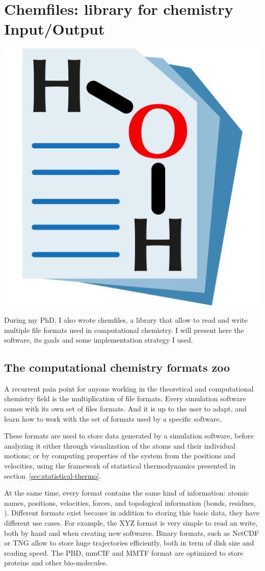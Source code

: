 \documentclass[thesis]{subfiles}
\begin{document}
\OnlyInSubfile{\appendix}
\chapter{Chemfiles: library for chemistry Input/Output}
\label{sec:chemfiles}

\vfill
\begin{center}
    \includegraphics[width=.3\textwidth]{figures/images/chemfiles-logo}
\end{center}
\vfill

During my PhD, I also wrote chemfiles, a library that allow to read and write
multiple file formats used in computational chemistry. I will present here the
software, its goals and some implementation strategy I used.

\newpage
\section{The computational chemistry formats zoo}

A recurrent pain point for anyone working in the theoretical and computational
chemistry field is the multiplication of file formats. Every simulation software
comes with its own set of files formats. And it is up to the user to adapt, and
learn how to work with the set of formats used by a specific software.

These formats are used to store data generated by a simulation software, before
analyzing it either through visualization of the atoms and their individual
motions; or by computing properties of the system from the positions and
velocities, using the framework of statistical thermodynamics presented in
section~\ref{sec:statistical-thermo}.

At the same time, every format contains the same kind of information: atomic
names, positions, velocities, forces, and topological information (bonds,
residues, \etc). Different formats exist because in addition to storing this
basic data, they have different use cases. For example, the XYZ format is very
simple to read an write, both by hand and when creating new softwares. Binary
formats, such as NetCDF or TNG allow to store huge trajectories efficiently,
both in term of disk size and reading speed. The PBD, mmCIF and MMTF format are
optimized to store proteins and other bio-molecules.
\end{document}
